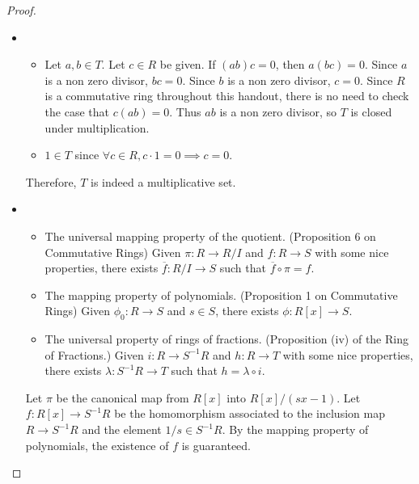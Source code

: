 \documentclass[12pt, psamsfonts]{amsart}
\theoremstyle{definition}
\theoremstyle{remark}
\numberwithin{equation}{section}
\begin{document}
\begin{proof}
  $ $
  \begin{itemize}
    \item
      \begin{itemize}
        \item
          Let $a, b \in T$.
          Let $c \in R$ be given.
          If $(ab)c = 0$, then $a(bc) = 0$.
          Since $a$ is a non zero divisor, $bc = 0$.
          Since $b$ is a non zero divisor, $c = 0$.
          Since $R$ is a commutative ring throughout this handout, there is no need to check the case that $c(ab) = 0$.
          Thus $ab$ is a non zero divisor, so $T$ is closed under multiplication.
        \item
          $1 \in T$ since $\forall c \in R, c \cdot 1 = 0 \implies c = 0$.
      \end{itemize}

      Therefore, $T$ is indeed a multiplicative set.
    \item
      \begin{itemize}
        \item
          The universal mapping property of the quotient.
          (Proposition 6 on Commutative Rings)
          Given $\pi: R \rightarrow R / I$ and $f: R \rightarrow S$ with some nice properties, there exists $\overline{f}: R / I \rightarrow S$ such that $\overline{f} \circ \pi = f$.
        \item
          The mapping property of polynomials.
          (Proposition 1 on Commutative Rings)
          Given $\phi_0:R \rightarrow S$ and $s \in S$, there exists $\phi:R[x] \rightarrow S$.
        \item
          The universal property of rings of fractions.
          (Proposition (iv) of the Ring of Fractions.)
          Given $i: R \rightarrow S^{-1}R$ and $h: R \rightarrow T$ with some nice properties, there exists $\lambda: S^{-1}R \rightarrow T$ such that $h = \lambda \circ i$.
      \end{itemize}
      Let $\pi$ be the canonical map from $R[x]$ into $R[x] / (sx - 1)$.
      Let $f: R[x] \rightarrow S^{-1}R$ be the homomorphism associated to the inclusion map $R \rightarrow S^{-1}R$ and the element $1 / s \in S^{-1}R$.
      By the mapping property of polynomials, the existence of $f$ is guaranteed.


\end{itemize}
\end{proof}
\end{document}

